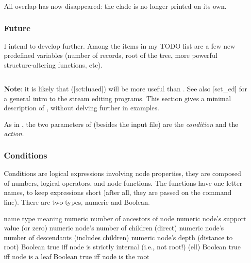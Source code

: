 
All overlap has now disappeared: the
 clade is no longer printed on its own. 

\subsubsection{Future}

I intend to develop \luaed{} further. Among the items in my TODO list are a few
new predefined variables (number of records, root of the tree, more powerful
structure-altering functions, etc).

%

\subsection{\ed}

{\bf Note}: it is likely that \luaed{} (\in{}[sct:luaed]) will be more useful
than \ed. See also [sct_ed] for a general intro to the stream
editing programs. This section gives a minimal description of \ed, without
delving further in examples.

As in \luaed, the two parameters of \ed{} (besides the input file) are the
{\it condition} and the {\it action}. 

\subsubsection{Conditions}

Conditions are logical expressions involving node properties, they are composed
of numbers, logical operators, and node functions.  The functions have
one-letter names, to keep expressions short (after all, they are passed on the
command line). There are two types, numeric and Boolean.

\startalignment[center]
	\starttabulate[|c|l|l|]
		\NC name \NC type \NC meaning \NC\NR
		\HL
		\NC {} \NC numeric \NC number of ancestors of node	 \NC\NR
		\NC {} \NC numeric \NC node's support value (or zero) \NC\NR
		\NC {} \NC numeric \NC node's number of children (direct) \NC\NR
		\NC {} \NC numeric \NC node's number of descendants (includes children) \NC\NR
		\NC {} \NC numeric \NC node's depth (distance to root) \NC\NR
		\NC {} \NC Boolean \NC true iff node is strictly internal (i.e., not root!) \NC\NR
		\NC {} (ell) \NC Boolean \NC true iff node is a leaf \NC\NR
		\NC {} \NC Boolean \NC true iff node is the root \NC\NR
	\stoptabulate
\stopalignment

